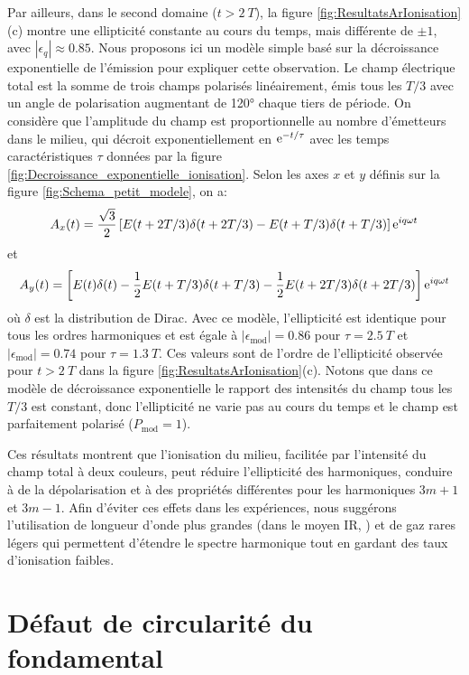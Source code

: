 Par ailleurs, dans le second domaine ($t > 2 \: T$), la figure \ref{fig:ResultatsArIonisation}(c) montre une ellipticité constante au cours du temps, mais différente de $\pm 1$, avec $|\epsilon_q| \approx 0.85$. Nous proposons ici un modèle simple basé sur la décroissance exponentielle de l'émission pour expliquer cette observation. Le champ électrique total est la somme de trois champs polarisés linéairement, émis tous les $T/3$ avec un angle de polarisation augmentant de 120° chaque tiers de période. On considère que l'amplitude du champ est proportionnelle au nombre d'émetteurs dans le milieu, qui décroit exponentiellement en $\mathrm{e}^{-t/\tau}$ avec les temps caractéristiques $\tau$ données par la figure \ref{fig:Decroissance_exponentielle_ionisation}. Selon les axes $x$ et $y$ définis sur la figure \ref{fig:Schema_petit_modele}, on a:
\begin{equation}
A_x (t) = \frac{\sqrt{3}}{2} \left[ E(t+2T/3) \delta(t+2T/3) - E(t+T/3) \delta(t+T/3) \right] \mathrm{e}^{iq\omega t}
\end{equation}
et
\begin{equation}
A_y (t) = \left[ E(t) \delta(t) - \frac{1}{2} E(t+T/3) \delta(t+T/3) - \frac{1}{2} E(t+2T/3) \delta(t+2T/3) \right] \mathrm{e}^{iq\omega t}
\end{equation}
où $\delta$ est la distribution de Dirac. Avec ce modèle, l'ellipticité est identique pour tous les ordres harmoniques et est égale à $|\epsilon_{\text{mod}}| = 0.86$ pour $\tau = 2.5 \: T$ et $|\epsilon_{\text{mod}}| = 0.74$ pour $\tau = 1.3 \: T$. Ces valeurs sont de l'ordre de l'ellipticité observée pour $t > 2 \: T$ dans la figure \ref{fig:ResultatsArIonisation}(c). Notons que dans ce modèle de décroissance exponentielle le rapport des intensités du champ tous les $T/3$ est constant, donc l'ellipticité ne varie pas au cours du temps et le champ est parfaitement polarisé ($P_{\text{mod}} = 1$).

Ces résultats montrent que l'ionisation du milieu, facilitée par l'intensité du champ total à deux couleurs, peut réduire l'ellipticité des harmoniques, conduire à de la dépolarisation et à des propriétés différentes pour les harmoniques $3m+1$ et $3m-1$. Afin d'éviter ces effets dans les expériences, nous suggérons l'utilisation de longueur d'onde plus grandes (dans le moyen IR, ) et de gaz rares légers qui permettent d'étendre le spectre harmonique tout en gardant des taux d'ionisation faibles.

\section{Défaut de circularité du fondamental}

